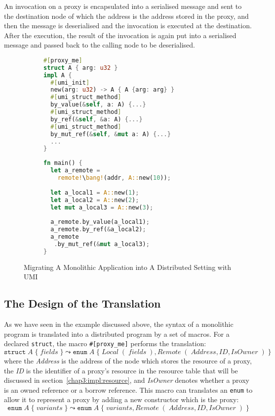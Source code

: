 An invocation on a proxy is encapsulated into a serialised message and sent to the destination node of which the address is the address stored in the proxy, and then the message is deserialised and the invocation is executed at the destination. After the execution, the result of the invocation is again put into a serialised message and passed back to the calling node to be deserialised.
\begin{figure}[t]
\centering
\begin{subfigure}[t]{0.53\textwidth}
    \centering
\begin{lstlisting}[language=Rust, style=boxed]
#[proxy_me]
struct A { arg: u32 }
impl A {
  #[umi_init]
  new(arg: u32) -> A { A {arg: arg} }
  #[umi_struct_method]
  by_value(&self, a: A) {...}
  #[umi_struct_method]
  by_ref(&self, &a: A) {...}
  #[umi_struct_method]
  by_mut_ref(&self, &mut a: A) {...}
  ...
}
\end{lstlisting}
\end{subfigure}
\hfill
\begin{subfigure}[t]{0.45\textwidth}
    \centering
\begin{lstlisting}[language=Rust, style=boxed]
fn main() {
  let a_remote = 
    remote!\bang!(addr, A::new(10));
  
  let a_local1 = A::new(1);
  let a_local2 = A::new(2);
  let mut a_local3 = A::new(3);
  
  a_remote.by_value(a_local1);
  a_remote.by_ref(&a_local2);
  a_remote
   .by_mut_ref(&mut a_local3);
}
\end{lstlisting}
\end{subfigure}
\vspace{1em}
\caption{Migrating A Monolithic Application into A Distributed Setting with UMI}
\label{chap3:impl:overview:fig}
\end{figure}

\subsection{The Design of the Translation}
\label{chap3:impl:proxy}
As we have seen in the example discussed above, the syntax of a monolithic program is translated into a distributed program by a set of macros. For a declared \texttt{struct}, the macro \texttt{\#[proxy\_me]} performs the translation:
\[
\texttt{struct}\; A\;\{\; \mathit{fields}\;\} \leadsto \texttt{enum}\; A\;\{\; \mathit{Local}\;(\;\mathit{fields}\;), \mathit{Remote}\;(\;\mathit{Address}, \mathit{ID}, \mathit{IsOwner}\;)\;\} 
\]
where the \textit{Address} is the address of the node which stores the resource of a proxy, the \textit{ID} is the identifier of a proxy's resource in the resource table that will be discussed in section~\ref{chap3:impl:resource}, and \textit{IsOwner} denotes whether a proxy is an owned reference or a borrow reference.
This macro can translates an \texttt{enum} to allow it to represent a proxy by adding a new constructor which is the proxy:
\[
\texttt{enum}\; A\;\{\; \mathit{variants}\;\} \leadsto \texttt{enum}\; A\;\{\; \mathit{variants}, \mathit{Remote}\;(\;\mathit{Address}, \mathit{ID}, \mathit{IsOwner}\;)\;\} 
\]

